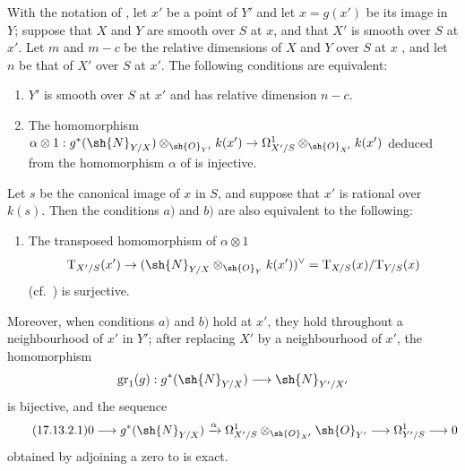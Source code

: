 \begin{proposition}[17.13.2]
\label{IV.17.13.2}
With the notation of , let $x'$ be a point of $Y'$ and let $x=g(x')$ be its image in $Y$; suppose that $X$ and $Y$ are smooth over $S$ at $x$, and that $X'$ is smooth over $S$ at $x'$.
Let $m$ and $m-c$ be the relative dimensions of $X$ and $Y$ over $S$ at $x$ , and let $n$ be that of $X'$ over $S$ at $x'$.
The following conditions are equivalent:
\begin{enumerate}
  \item[a)] $Y'$ is smooth over $S$ at $x'$ and has relative dimension $n-c$.
  \item[b)] The homomorphism $\alpha\otimes 1:g^*(\sh{N}_{Y/X})\otimes_{\sh{O}_{Y'}} k(x') \to \Omega^1_{X'/S}\otimes_{\sh{O}_{X'}} k(x')$ deduced from the homomorphism $\alpha$ of  is injective.
\end{enumerate}
Let $s$ be the canonical image of $x$ in $S$, and suppose that $x'$ is rational over $k(s)$.
Then the conditions $a)$ and $b)$ are also equivalent to the following:
\begin{enumerate}
  \item[b')] The transposed homomorphism of $\alpha\otimes 1$
\[
\mathrm{T}_{X'/S}(x') \to (\sh{N}_{Y/X}\otimes_{\sh{O}_Y} k(x'))^\vee = \mathrm{T}_{X/S}(x)/\mathrm{T}_{Y/S}(x)
\]
(cf.\ ) is surjective.
\end{enumerate}
Moreover, when conditions $a)$ and $b)$ hold at $x'$, they hold throughout a neighbourhood of $x'$ in $Y'$; after replacing $X'$ by a neighbourhood of $x'$, the homomorphism
\[
  \operatorname{gr}_1(g):g^*(\sh{N}_{Y/X})\longrightarrow\sh{N}_{Y'/X'}
\]
is bijective, and the sequence
\begin{equation}
\label{IV.17.13.2.1}
\tag{17.13.2.1}
  0\longrightarrow g^*(\sh{N}_{Y/X})
  \xrightarrow{\alpha}
  \Omega^1_{X'/S}\otimes_{\sh{O}_{X'}}\sh{O}_{Y'}
  \longrightarrow\Omega^1_{Y'/S}\longrightarrow0
\end{equation}
obtained by adjoining a zero to  is exact.
\end{proposition}

